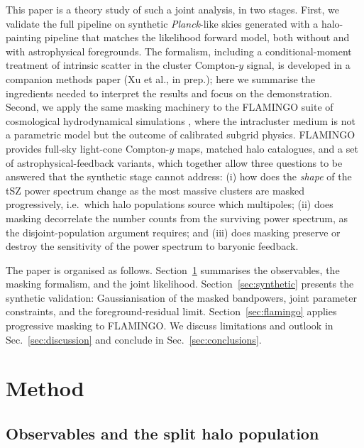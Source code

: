 \documentclass[aps,prd,twocolumn,superscriptaddress,nofootinbib,floatfix]{revtex4-2}
\begin{document}
This paper is a theory study of such a joint analysis, in two stages.
First, we validate the full pipeline on synthetic \textit{Planck}-like skies generated with a halo-painting pipeline that matches the likelihood forward model, both without and with astrophysical foregrounds.
The formalism, including a conditional-moment treatment of intrinsic scatter in the cluster Compton-$y$ signal, is developed in a companion methods paper (Xu et al., in prep.); here we summarise the ingredients needed to interpret the results and focus on the demonstration.
Second, we apply the same masking machinery to the FLAMINGO suite of cosmological hydrodynamical simulations \citep{Schaye2023,Kugel2023}, where the intracluster medium is not a parametric model but the outcome of calibrated subgrid physics.
FLAMINGO provides full-sky light-cone Compton-$y$ maps, matched halo catalogues, and a set of astrophysical-feedback variants, which together allow three questions to be answered that the synthetic stage cannot address:
(i) how does the \emph{shape} of the tSZ power spectrum change as the most massive clusters are masked progressively, i.e.\ which halo populations source which multipoles;
(ii) does masking decorrelate the number counts from the surviving power spectrum, as the disjoint-population argument requires; and
(iii) does masking preserve or destroy the sensitivity of the power spectrum to baryonic feedback.

The paper is organised as follows.
Section~\ref{sec:method} summarises the observables, the masking formalism, and the joint likelihood.
Section~\ref{sec:synthetic} presents the synthetic validation: Gaussianisation of the masked bandpowers, joint parameter constraints, and the foreground-residual limit.
Section~\ref{sec:flamingo} applies progressive masking to FLAMINGO.
We discuss limitations and outlook in Sec.~\ref{sec:discussion} and conclude in Sec.~\ref{sec:conclusions}.

\section{Method}
\label{sec:method}

\subsection{Observables and the split halo population}
\label{sec:observables}
\end{document}
